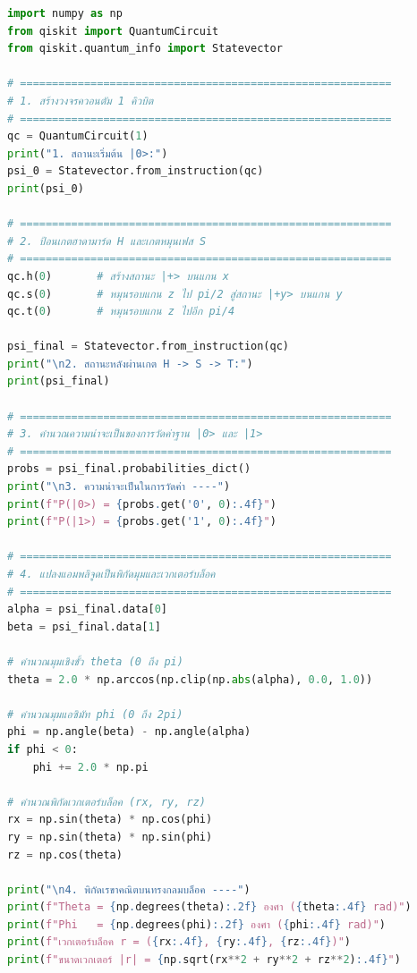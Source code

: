 \begin{tcolorbox}[colback=slateGrey!5, colframe=darkNavy, title={\textbf{Python 3 Script ---- Qiskit Qubit Statevector \& Bloch Sphere Coordinates}}]
\begin{lstlisting}[language=Python]
import numpy as np
from qiskit import QuantumCircuit
from qiskit.quantum_info import Statevector

# ==========================================================
# 1. สร้างวงจรควอนตัม 1 คิวบิต
# ==========================================================
qc = QuantumCircuit(1)
print("1. สถานะเริ่มต้น |0>:")
psi_0 = Statevector.from_instruction(qc)
print(psi_0)

# ==========================================================
# 2. ป้อนเกตฮาดามาร์ด H และเกตหมุนเฟส S
# ==========================================================
qc.h(0)       # สร้างสถานะ |+> บนแกน x
qc.s(0)       # หมุนรอบแกน z ไป pi/2 สู่สถานะ |+y> บนแกน y
qc.t(0)       # หมุนรอบแกน z ไปอีก pi/4

psi_final = Statevector.from_instruction(qc)
print("\n2. สถานะหลังผ่านเกต H -> S -> T:")
print(psi_final)

# ==========================================================
# 3. คำนวณความน่าจะเป็นของการวัดค่าฐาน |0> และ |1>
# ==========================================================
probs = psi_final.probabilities_dict()
print("\n3. ความน่าจะเป็นในการวัดค่า ----")
print(f"P(|0>) = {probs.get('0', 0):.4f}")
print(f"P(|1>) = {probs.get('1', 0):.4f}")

# ==========================================================
# 4. แปลงแอมพลิจูดเป็นพิกัดมุมและเวกเตอร์บล็อค
# ==========================================================
alpha = psi_final.data[0]
beta = psi_final.data[1]

# คำนวณมุมเชิงขั้ว theta (0 ถึง pi)
theta = 2.0 * np.arccos(np.clip(np.abs(alpha), 0.0, 1.0))

# คำนวณมุมแอซิมัท phi (0 ถึง 2pi)
phi = np.angle(beta) - np.angle(alpha)
if phi < 0:
    phi += 2.0 * np.pi

# คำนวณพิกัดเวกเตอร์บล็อค (rx, ry, rz)
rx = np.sin(theta) * np.cos(phi)
ry = np.sin(theta) * np.sin(phi)
rz = np.cos(theta)

print("\n4. พิกัดเรขาคณิตบนทรงกลมบล็อค ----")
print(f"Theta = {np.degrees(theta):.2f} องศา ({theta:.4f} rad)")
print(f"Phi   = {np.degrees(phi):.2f} องศา ({phi:.4f} rad)")
print(f"เวกเตอร์บล็อค r = ({rx:.4f}, {ry:.4f}, {rz:.4f})")
print(f"ขนาดเวกเตอร์ |r| = {np.sqrt(rx**2 + ry**2 + rz**2):.4f}")
\end{lstlisting}
\end{tcolorbox}

